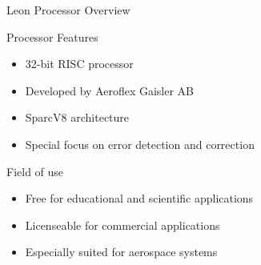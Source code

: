 \begin{frame}{Leon Processor Overview}
    \begin{block}{Processor Features}
      \begin{itemize}
        \item 32-bit RISC processor
        \item Developed by Aeroflex Gaisler AB
        \item SparcV8 architecture
        \item Special focus on error detection and correction
      \end{itemize} 

    \end{block} \pause
    
    \begin{block}{Field of use}
      \begin{itemize}
        \item Free for educational and scientific applications
        \item Licenseable for commercial applications
        \item Especially suited for aerospace systems
      \end{itemize} 

    \end{block}

\end{frame}



